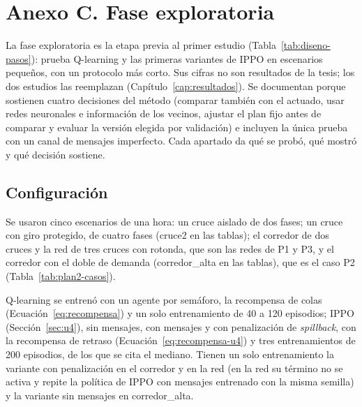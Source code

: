 \section*{Anexo C. Fase exploratoria}
{}
\setcounter{table}{0}
\renewcommand{\thetable}{C.\arabic{table}}
\renewcommand{\theHtable}{C.\arabic{table}}
\setcounter{figure}{0}
\renewcommand{\thefigure}{C.\arabic{figure}}
\renewcommand{\theHfigure}{C.\arabic{figure}}

La fase exploratoria es la etapa previa al primer estudio
(Tabla~\ref{tab:diseno-pasos}): prueba Q-learning y las primeras
variantes de IPPO en escenarios pequeños, con un protocolo más corto.
Sus cifras no son resultados de la tesis; los dos estudios las
reemplazan (Capítulo~\ref{cap:resultados}). Se documentan porque
sostienen cuatro decisiones del método (comparar también con el
actuado, usar redes neuronales e información de los vecinos, ajustar el
plan fijo antes de comparar y evaluar la versión elegida por
validación) e incluyen la única prueba con un canal de mensajes
imperfecto. Cada apartado da qué se probó, qué mostró y qué decisión
sostiene.

\subsection*{Configuración}

Se usaron cinco escenarios de una hora: un cruce aislado de dos fases;
un cruce con giro protegido, de cuatro fases (cruce2 en las tablas); el
corredor de dos cruces y la red de tres cruces con rotonda, que son las
redes de P1 y P3, y el corredor con el doble de demanda (corredor\_alta
en las tablas), que es el caso P2 (Tabla~\ref{tab:plan2-casos}).

Q-learning se entrenó con un agente por semáforo, la recompensa de
colas (Ecuación~\ref{eq:recompensa}) y un solo entrenamiento de 40 a
120 episodios; IPPO (Sección~\ref{sec:u4}), sin mensajes, con mensajes
y con penalización de \textit{spillback}, con la recompensa de retraso
(Ecuación~\ref{eq:recompensa-u4}) y tres entrenamientos de 200
episodios, de los que se cita el mediano. Tienen un solo entrenamiento
la variante con penalización en el corredor y en la red (en la red su
término no se activa y repite la política de IPPO con mensajes
entrenado con la misma semilla) y la variante sin mensajes en
corredor\_alta.

